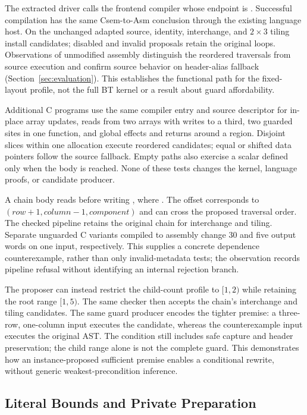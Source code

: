 The extracted driver calls the frontend compiler whose endpoint is
. Successful compilation has the same
Csem-to-Asm conclusion through the existing language host. On the unchanged
adapted source, identity, interchange, and $2\times3$ tiling install candidates;
disabled and invalid proposals retain the original loops. Observations of
unmodified assembly distinguish the reordered traversals from source execution
and confirm source behavior on header-alias fallback (Section~\ref{sec:evaluation}).
This establishes the functional path for the fixed-layout profile, not the full
BT kernel or a result about guard affordability.

Additional C programs use the same compiler entry and source descriptor for
in-place array updates, reads from two arrays with writes to a third, two guarded
sites in one function, and global effects and returns around a region. Disjoint
slices within one allocation execute reordered candidates; equal or shifted
data pointers follow the source fallback. Empty paths also exercise a scalar
defined only when the body is reached. None of these tests changes the kernel,
language proofs, or candidate producer.

A chain body reads  before writing , where
. The offset corresponds to
$(\mathit{row}+1,\mathit{column}-1,\mathit{component})$ and can cross the proposed
traversal order. The checked pipeline retains the original chain for interchange
and tiling. Separate unguarded C variants compiled to assembly change 30 and five
output words on one input, respectively. This supplies a concrete dependence
counterexample, rather than only invalid-metadata tests; the observation records
pipeline refusal without identifying an internal rejection branch.

The proposer can instead restrict the child-count profile to $[1,2)$ while
retaining the root range $[1,5)$. The same checker then accepts the chain's
interchange and tiling candidates. The same guard producer encodes the tighter
premise: a three-row, one-column input executes the candidate, whereas the
counterexample input executes the original AST. The condition still includes
safe capture and header preservation; the child range alone is not the complete
guard. This demonstrates how an instance-proposed sufficient premise enables a
conditional rewrite, without generic weakest-precondition inference.

\subsection{Literal Bounds and Private Preparation}

